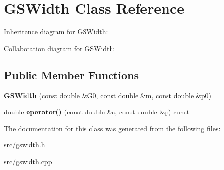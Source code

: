 \hypertarget{class_g_s_width}{}\section{G\+S\+Width Class Reference}
\label{class_g_s_width}


Inheritance diagram for G\+S\+Width\+:


Collaboration diagram for G\+S\+Width\+:
\subsection*{Public Member Functions}
\begin{DoxyCompactItemize}
\item 
\hypertarget{class_g_s_width_a14eea4f0b6b22ba2ad33084edd88bbd5}{}{\bfseries G\+S\+Width} (const double \&G0, const double \&m, const double \&p0)\label{class_g_s_width_a14eea4f0b6b22ba2ad33084edd88bbd5}

\item 
\hypertarget{class_g_s_width_a573c35b1d12ed3ca72dec69cdae4ad9c}{}double {\bfseries operator()} (const double \&s, const double \&p) const \label{class_g_s_width_a573c35b1d12ed3ca72dec69cdae4ad9c}

\end{DoxyCompactItemize}


The documentation for this class was generated from the following files\+:\begin{DoxyCompactItemize}
\item 
src/gswidth.\+h\item 
src/gswidth.\+cpp\end{DoxyCompactItemize}
